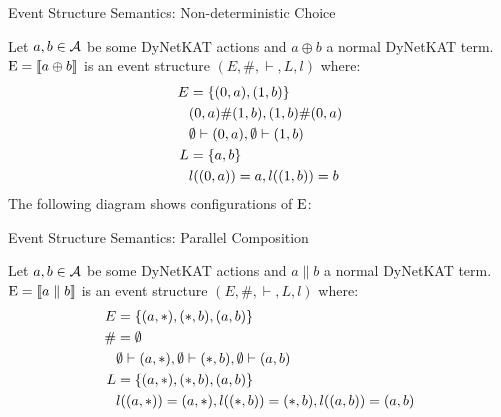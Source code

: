 \begin{frame}{Event Structure Semantics: Non-deterministic Choice}
    \begin{example}
        Let $a,b\in \mathcal{A}$ be some DyNetKAT actions and $a\oplus b$ a
        normal DyNetKAT term.
        $\mathrm{E} = \llbracket a\oplus b \rrbracket$ is an event structure
        $(E,\#,\vdash,L,l)$ where:
        \begin{align*}
            E & = \{(0,a),(1,b)\}                \\
              & (0,a) \# (1,b) , (1,b) \# (0,a)  \\
              & \emptyset \vdash (0,a), \emptyset \vdash (1,b) \\
            L & = \{a,b\}                        \\
              & l((0,a)) = a, l((1,b)) = b       
        \end{align*}
        The following diagram shows configurations of $\mathrm{E}$:
        \begin{center}
        \end{center}
    \end{example}
\end{frame}

\begin{frame}{Event Structure Semantics: Parallel Composition}
    \begin{example}
        Let $a,b\in \mathcal{A}$ be some DyNetKAT actions and $a\parallel b$ a
        normal DyNetKAT term.
        $\mathrm{E} = \llbracket a\parallel b \rrbracket$ is an event structure
        $(E,\#,\vdash,L,l)$ where:
        \begin{align*}
            E  & = \{(a,*),(*,b),(a,b)\}                           \\
            \# & = \emptyset                                              \\
               & \emptyset \vdash (a,*), \emptyset \vdash (*,b),\emptyset \vdash (a,b)  \\
            L  & = \{(a,*),(*,b),(a,b)\}                           \\
               & l((a,*)) = (a,*), l((*,b)) = (*,b),l((a,b))=(a,b) 
        \end{align*}
    \end{example}
\end{frame}

